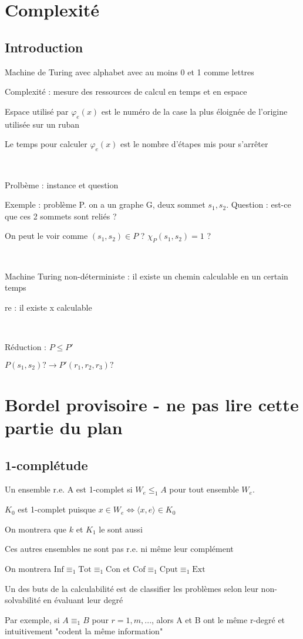 \documentclass{book}
\theoremstyle{definition}
\numberwithin{lemma}{subsection}
\numberwithin{theorem}{subsection}
\numberwithin{definition}{subsection}
\numberwithin{proposition}{subsection}
\numberwithin{corollary}{subsection}
\numberwithin{property}{subsection}
\numberwithin{example}{subsection}
\numberwithin{heuristique}{subsection}
\numberwithin{scenario}{subsection}
\newcommand{\Pairing}[1]{\langle #1 \rangle}
\newcommand{\EnsInf}{\mathrm{Inf}}
\newcommand{\EnsTot}{\mathrm{Tot}}
\newcommand{\EnsCon}{\mathrm{Con}}
\newcommand{\EnsCof}{\mathrm{Cof}}
\newcommand{\EnsCput}{\mathrm{Cput}}
\newcommand{\EnsExt}{\mathrm{Ext}}
\begin{document}
\chapter{Complexité}
    \section*{Introduction}

Machine de Turing avec alphabet avec au moins 0 et 1 comme lettres
\par Complexité : mesure des ressources de calcul en temps et en espace
\par Espace utilisé par $\varphi_e(x)$ est le numéro de la case la plus éloignée de l'origine utilisée sur un ruban
\par Le temps pour calculer $\varphi_e(x)$ est le nombre d'étapes mis pour s'arrêter
\par ~
\par Prolbème : instance et question
\par Exemple : problème P. on a un graphe G, deux sommet $s_1,s_2$. Question : est-ce que ces 2 sommets sont reliés ?
\par On peut le voir comme $(s_1,s_2)\in P$ ? $\chi_P(s_1,s_2)=1$ ?
\par ~
\par Machine Turing non-déterministe : il existe un chemin calculable en un certain temps
\par re : il existe x calculable
\par ~
\par Réduction : $P \leqslant P'$
\par $P(s_1,s_2)? \longrightarrow P'(r_1,r_2,r_3)?$

\chapter{Bordel provisoire - ne pas lire cette partie du plan}
\section{1-complétude}

\par Un ensemble r.e. A est 1-complet si $W_e \leqslant_1 A$ pour tout ensemble $W_e$.
\par $K_0$ est 1-complet puisque $x \in W_e \Leftrightarrow \Pairing{x, e} \in K_0$
\par On montrera que $k$ et $K_1$ le sont aussi
\par Ces autres ensembles ne sont pas r.e. ni même leur complément
\par On montrera $\EnsInf \equiv_1 \EnsTot \equiv_1 \EnsCon$ et $\EnsCof \equiv_1  \EnsCput \equiv_1 \EnsExt$
\par Un des buts de la calculabilité est de classifier les problèmes selon leur non-solvabilité en évaluant leur degré
\par Par exemple, si $A\equiv_1 B$ pour $r=1,m,...$, alors A et B ont le même r-degré et intuitivement "codent la même information"
\end{document}
